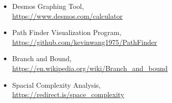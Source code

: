 \documentclass[article, a4paper, 12pt, oneside]{memoir}
\begin{document}
\begin{itemize}
	\item Desmos Graphing Tool,\\
	\color{blue} \underline{\href{https://www.desmos.com/calculator}{https://www.desmos.com/calculator}} \color{black}
	\item Path Finder Visualization Program,\\
	\color{blue} \underline{\href{https://github.com/kevinwang1975/PathFinder}{https://github.com/kevinwang1975/PathFinder}} \color{black}
	\item Branch and Bound,\\
	\color{blue} \underline{\href{https://en.wikipedia.org/wiki/Branch_and_bound}{https://en.wikipedia.org/wiki/Branch\_and\_bound}} \color{black}
	\item Spacial Complexity Analysis,\\
	\color{blue} \underline{\href{https://cs.stackexchange.com/questions/83574/does-space-complexity-analysis-usually-include-output-space}{https://redirect.is/space\_complexity}} \color{black}
\end{itemize}
\end{document}
